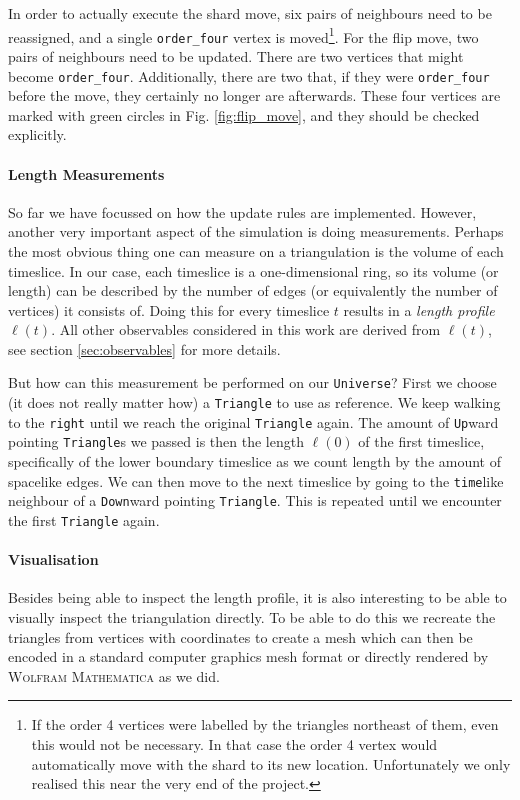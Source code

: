 In order to actually execute the shard move, six pairs of neighbours need to be reassigned, and a single \verb|order_four| vertex is moved\footnote{If the order 4 vertices were labelled by the triangles northeast of them, even this would not be necessary. In that case the order 4 vertex would automatically move with the shard to its new location. Unfortunately we only realised this near the very end of the project.}. For the flip move, two pairs of neighbours need to be updated. There are two vertices that might become \verb|order_four|. Additionally, there are two that, if they were \verb|order_four| before the move, they certainly no longer are afterwards. These four vertices are marked with green circles in Fig. \ref{fig:flip_move}, and they should be checked explicitly.

\paragraph{Length Measurements}
So far we have focussed on how the update rules are implemented. However, another very important aspect of the simulation is doing measurements. Perhaps the most obvious thing one can measure on a triangulation is the volume of each timeslice. In our case, each timeslice is a one-dimensional ring, so its volume (or length) can be described by the number of edges (or equivalently the number of vertices) it consists of. Doing this for every timeslice $t$ results in a \emph{length profile} $\ell(t)$. All other observables considered in this work are derived from $\ell(t)$, see section \ref{sec:observables} for more details.

But how can this measurement be performed on our \verb|Universe|? First we choose (it does not really matter how) a \verb|Triangle| to use as reference. We keep walking to the \verb|right| until we reach the original \verb|Triangle| again. The amount of \verb|Up|ward pointing \verb|Triangle|s we passed is then the length $\ell(0)$ of the first timeslice, specifically of the lower boundary timeslice as we count length by the amount of spacelike edges. We can then move to the next timeslice by going to the \verb|time|like neighbour of a \verb|Down|ward pointing \verb|Triangle|. This is repeated until we encounter the first \verb|Triangle| again.

\paragraph{Visualisation}
Besides being able to inspect the length profile, it is also interesting to be able to visually inspect the triangulation directly.
To be able to do this we recreate the triangles from vertices with coordinates to create a mesh which can then be encoded in a standard computer graphics mesh format or directly rendered by \textsc{Wolfram Mathematica} as we did.

